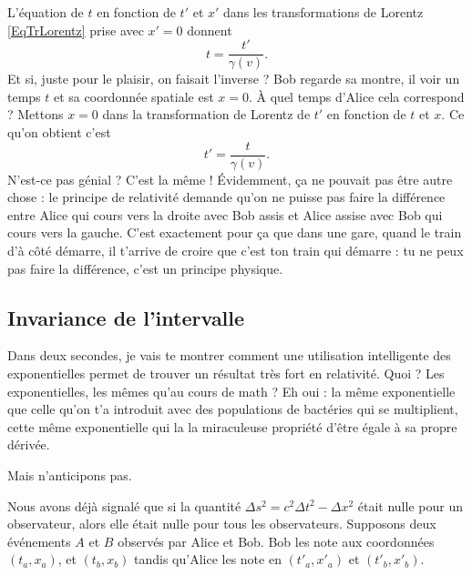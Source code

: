 L'équation de \( t\) en fonction de \( t'\) et \( x'\) dans les transformations de Lorentz \eqref{EqTrLorentz} prise avec \( x'=0\) donnent
\[
	t=\frac{ t' }{ \gamma(v) }.
\]
Et si, juste pour le plaisir, on faisait l'inverse ? Bob regarde sa montre, il voir un temps \( t\) et sa coordonnée spatiale est \( x=0\). À quel temps d'Alice cela correspond ? Mettons \( x=0\) dans la transformation de Lorentz de \( t'\) en fonction de \( t\) et \( x\). Ce qu'on obtient c'est
\[
	t'=\frac{ t }{ \gamma(v) }.
\]
N'est-ce pas génial ? C'est la même ! Évidemment, ça ne pouvait pas être autre chose : le principe de relativité demande qu'on ne puisse pas faire la différence entre Alice qui cours vers la droite avec Bob assis et Alice assise avec Bob qui cours vers la gauche. C'est exactement pour ça que dans une gare, quand le train d'à côté démarre, il t'arrive de croire que c'est ton train qui démarre : tu ne peux pas faire la différence, c'est un principe physique.


\subsection{Invariance de l'intervalle}

Dans deux secondes, je vais te montrer comment une utilisation intelligente des exponentielles permet de trouver un résultat très fort en relativité. Quoi ? Les exponentielles, les mêmes qu'au cours de math ? Eh oui : la même exponentielle que celle qu'on t'a introduit avec des populations de bactéries qui se multiplient, cette même exponentielle qui la la miraculeuse propriété d'être égale à sa propre dérivée.

Mais n'anticipons pas.

Nous avons déjà signalé que si la quantité \( \Delta s^2=c^2\Delta t^2-\Delta x^2\) était nulle pour un observateur, alors elle était nulle pour tous les observateurs. Supposons deux événements \( A\) et \( B\) observés par Alice et Bob. Bob les note aux coordonnées \( (t_a,x_a)\), et \( (t_b,x_b)\) tandis qu'Alice les note en \( (t'_a,x'_a)\) et \( (t'_b,x'_b)\).

